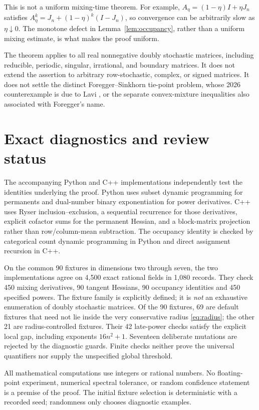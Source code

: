 \documentclass[11pt]{article}
\theoremstyle{remark}\newtheorem{remark}[theorem]{Remark}
\begin{document}
This is not a uniform mixing-time theorem. For example,
$A_\eta=(1-\eta)I+\eta J_n$ satisfies
$A_\eta^k=J_n+(1-\eta)^k(I-J_n)$, so convergence can be arbitrarily
slow as $\eta\downarrow0$. The monotone defect in
Lemma~\ref{lem:occupancy}, rather than a uniform mixing estimate, is
what makes the proof uniform.

The theorem applies to all real nonnegative doubly stochastic matrices,
including reducible, periodic, singular, irrational, and boundary
matrices. It does not extend the assertion to arbitrary row-stochastic,
complex, or signed matrices. It does not settle the distinct
Foregger--Sinkhorn tie-point problem, whose 2026 counterexample is due
to Lavi \cite{Lavi}, or the separate convex-mixture inequalities also
associated with Foregger's name.

\section{Exact diagnostics and review status}
The accompanying Python and C++ implementations independently test the
identities underlying the proof. Python uses subset dynamic programming
for permanents and dual-number binary exponentiation for power
derivatives. C++ uses Ryser inclusion--exclusion, a sequential recurrence
for those derivatives, explicit cofactor sums for the permanent Hessian,
and a block-matrix projection rather than row/column-mean subtraction.
The occupancy identity is checked by categorical count dynamic
programming in Python and direct assignment recursion in C++.

On the common 90 fixtures in dimensions two through seven, the two
implementations agree on 4,500 exact rational fields in 1,080 records.
They check 450 mixing derivatives, 90 tangent Hessians, 90 occupancy
identities and 450 specified powers. The fixture family is explicitly
defined; it is \emph{not} an exhaustive enumeration of doubly stochastic
matrices. Of the 90 fixtures, 69 are default fixtures that need not lie inside
the very conservative radius \eqref{eq:radius}; the other 21 are
radius-controlled fixtures. Their 42 late-power checks satisfy the explicit local gap, including exponents $16n^2+1$.
Seventeen deliberate mutations are rejected by the diagnostic guards. Finite checks neither prove the universal
quantifiers nor supply the unspecified global threshold.

All mathematical computations use integers or rational numbers. No
floating-point experiment, numerical spectral tolerance, or random
confidence statement is a premise of the proof. The initial fixture
selection is deterministic with a recorded seed; randomness only chooses
diagnostic examples.
\end{document}
